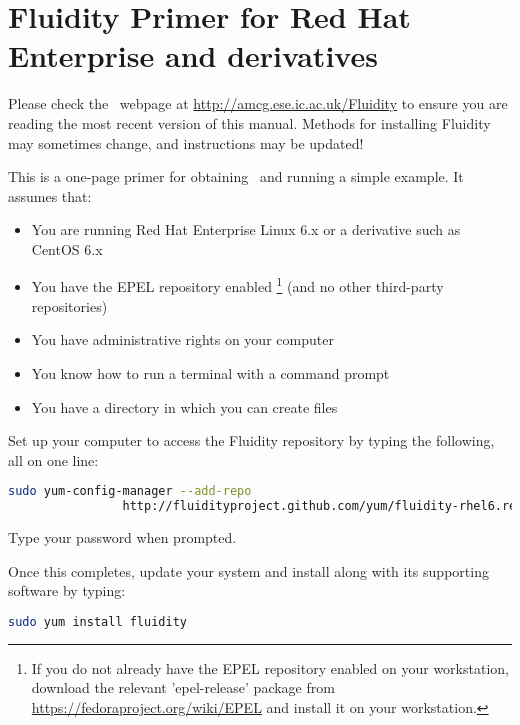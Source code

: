 \chapter*{Fluidity Primer for Red Hat Enterprise and derivatives}

Please check the \fluidity\ webpage at
\href{http://amcg.ese.ic.ac.uk/Fluidity}{http://amcg.ese.ic.ac.uk/Fluidity}
to ensure you are reading the most recent version of this manual. Methods for
installing Fluidity may sometimes change, and instructions may be updated!

This is a one-page primer for obtaining \fluidity\ and running a simple example. It assumes that:

\begin{itemize}
 \item You are running Red Hat Enterprise Linux 6.x or a derivative such as CentOS 6.x
 \item You have the EPEL repository enabled
         \footnote{
           If you do not already have the EPEL repository enabled on your workstation,
           download the relevant 'epel-release' package from
           \href{https://fedoraproject.org/wiki/EPEL}{https://fedoraproject.org/wiki/EPEL}
           and install it on your workstation.
         }
         (and no other third-party repositories)
 \item You have administrative rights on your computer
 \item You know how to run a terminal with a command prompt
 \item You have a directory in which you can create files
\end{itemize}

Set up your computer to access the Fluidity repository by typing the following,
all on one line:

\begin{lstlisting}[language=Bash]
sudo yum-config-manager --add-repo
                http://fluidityproject.github.com/yum/fluidity-rhel6.repo
\end{lstlisting}

Type your password when prompted.

Once this completes, update your system and install \fluidity along with its
supporting software by typing:

\begin{lstlisting}[language=Bash]
sudo yum install fluidity
\end{lstlisting}

